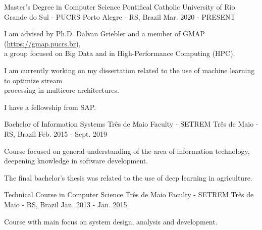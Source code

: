
\begin{cventries}
	\cventry
	{Master's Degree in Computer Science} %
	{Pontifical Catholic University of Rio Grande do Sul - PUCRS} %
	{Porto Alegre - RS, Brazil} %
	{Mar. 2020 - PRESENT} %
	{
		\begin{cvitems} %
			\item {I am advised by Ph.D. Dalvan Griebler and a member of GMAP (\href{https://gmap.pucrs.br}{https://gmap.pucrs.br}),\\a group focused on Big Data and in High-Performance Computing (HPC).}
			\item {I am currently working on my dissertation related to the use of machine learning to optimize stream\\processing in multicore architectures.}
			\item {I have a fellowship from SAP.}
		\end{cvitems}
	}

	\cventry
	{Bachelor of Information Systems} %
	{Três de Maio Faculty - SETREM} %
	{Três de Maio - RS, Brazil} %
	{Feb. 2015 - Sept. 2019} %
	{
		\begin{cvitems} %
			\item {Course focused on general understanding of the area of information technology,\\deepening knowledge in software development.}
			\item {The final bachelor's thesis was related to the use of deep learning in agriculture.}
		\end{cvitems}
	}

	\cventry
	{Technical Course in Computer Science} %
	{Três de Maio Faculty - SETREM} %
	{Três de Maio - RS, Brazil} %
	{Jan. 2013 - Jan. 2015} %
	{
		\begin{cvitems} %
			\item {Course with main focus on system design, analysis and development.}
		\end{cvitems}
	}
\end{cventries}
